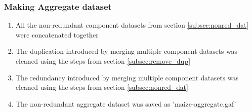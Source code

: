     \subsubsection{Making Aggregate dataset}
    \begin{enumerate}
      \item All the non-redundant component datasets from section \ref{subsec:nonred_dat} were concatenated together
      \item The duplication introduced by merging multiple component datasets was cleaned using the steps from section \ref{subsec:remove_dup}
      \item The redundancy introduced by merging multiple component datasets was cleaned using the steps from section \ref{subsec:nonred_dat}
      \item The non-redundant aggregate dataset was saved as 'maize-aggregate.gaf'
    \end{enumerate}




